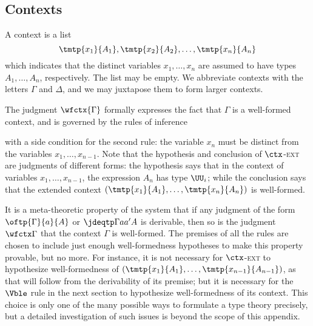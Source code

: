 \subsection{Contexts}
\label{subsec:contexts}

%
A context is a list
%
\begin{equation*}
  \tmtp{x_1}{A_1}, \tmtp{x_2}{A_2}, \ldots, \tmtp{x_n}{A_n}
\end{equation*}
%
which indicates that the distinct variables
%
$x_1, \ldots, x_n$ are assumed to have types $A_1, \ldots, A_n$, respectively. The list may be empty. We abbreviate contexts with the letters $\Gamma$ and $\Delta$, and we may juxtapose them to form larger contexts.

The judgment $\wfctx{\Gamma}$ formally expresses the fact that $\Gamma$ is a well-formed context, and is governed by the rules of inference
%
%
with a side condition for the second rule: the variable $x_n$ must be distinct from the variables $x_1, \ldots, x_{n-1}$.
Note that the hypothesis and conclusion of $\ctx$-\textsc{ext} are judgments of different forms: the hypothesis says that in the context of variables $x_1, \ldots, x_{n-1}$, the expression $A_n$ has type $\UU_i$; while the conclusion says that the extended context $(\tmtp{x_1}{A_1}, \ldots, \tmtp{x_n}{A_n})$ is well-formed.

It is a meta-theoretic property of the system that if any judgment of the form $\oftp{\Gamma}{a}{A}$ or $\jdeqtp\Gamma{a}{a'}{A}$ is derivable, then so is the judgment $\wfctx\Gamma$ that the context $\Gamma$ is well-formed.
The premises of all the rules are chosen to include just enough well-formedness hypotheses to make this property provable, but no more.
For instance, it is not necessary for $\ctx$-\textsc{ext} to hypothesize well-formedness of $(\tmtp{x_1}{A_1}, \ldots, \tmtp{x_{n-1}}{A_{n-1}})$, as that will follow from the derivability of its premise; but it is necessary for the $\Vble$ rule in the next section to hypothesize well-formedness of its context.
This choice is only one of the many possible ways to formulate a type theory precisely, but a detailed investigation of such issues is beyond the scope of this appendix.

